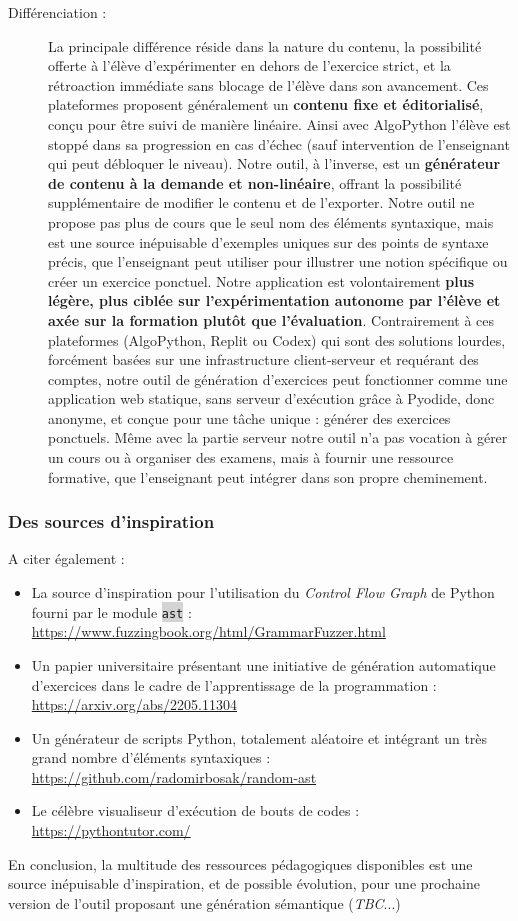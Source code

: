 \documentclass[11pt,a4paper]{article}
\newcommand{\code}[1]{\colorbox{lightgray}{\texttt{\small #1}}}
\begin{document}
\begin{description}
    \item[Différenciation :] La principale différence réside dans la nature du contenu, la possibilité offerte à l'élève d'expérimenter en dehors de l'exercice strict, et la rétroaction immédiate sans blocage de l'élève dans son avancement. Ces plateformes proposent généralement un \textbf{contenu fixe et éditorialisé}, conçu pour être suivi de manière linéaire. Ainsi avec AlgoPython l'élève est stoppé dans sa progression en cas d'échec (sauf intervention de l'enseignant qui peut débloquer le niveau). Notre outil, à l'inverse, est un \textbf{générateur de contenu à la demande et non-linéaire}, offrant la possibilité supplémentaire de modifier le contenu et de l'exporter. Notre outil ne propose pas plus de cours que le seul nom des éléments syntaxique, mais est une source inépuisable d'exemples uniques sur des points de syntaxe précis, que l'enseignant peut utiliser pour illustrer une notion spécifique ou créer un exercice ponctuel. Notre application est volontairement \textbf{plus légère, plus ciblée sur l'expérimentation autonome par l'élève et axée sur la formation plutôt que l'évaluation}. Contrairement à ces plateformes (AlgoPython, Replit ou Codex) qui sont des solutions lourdes, forcément basées sur une infrastructure client-serveur et requérant des comptes, notre outil de génération d'exercices peut fonctionner comme une application web statique, sans serveur d'exécution grâce à Pyodide, donc anonyme, et conçue pour une tâche unique : générer des exercices ponctuels. Même avec la partie serveur notre outil n'a pas vocation à gérer un cours ou à organiser des examens, mais à fournir une ressource formative, que l'enseignant peut intégrer dans son propre cheminement.
\end{description}

\subsubsection{Des sources d'inspiration}
A citer également :
\begin{itemize}
    \item La source d'inspiration pour l'utilisation du \textit{Control Flow Graph} de Python fourni par le module \code{ast} :  \url{https://www.fuzzingbook.org/html/GrammarFuzzer.html}
    \item Un papier universitaire présentant une initiative de génération automatique d'exercices dans le cadre de l'apprentissage de la programmation : \url{https://arxiv.org/abs/2205.11304}
    \item Un générateur de scripts Python, totalement aléatoire et intégrant un très grand nombre d'éléments syntaxiques : \url{https://github.com/radomirbosak/random-ast}
    \item Le célèbre visualiseur d'exécution de bouts de codes : \url{https://pythontutor.com/}
\end{itemize} 
\par En conclusion, la multitude des ressources pédagogiques disponibles est une source inépuisable d'inspiration, et de possible évolution, pour une prochaine version de l'outil proposant une génération sémantique (\textit{TBC}...)
\end{document}
